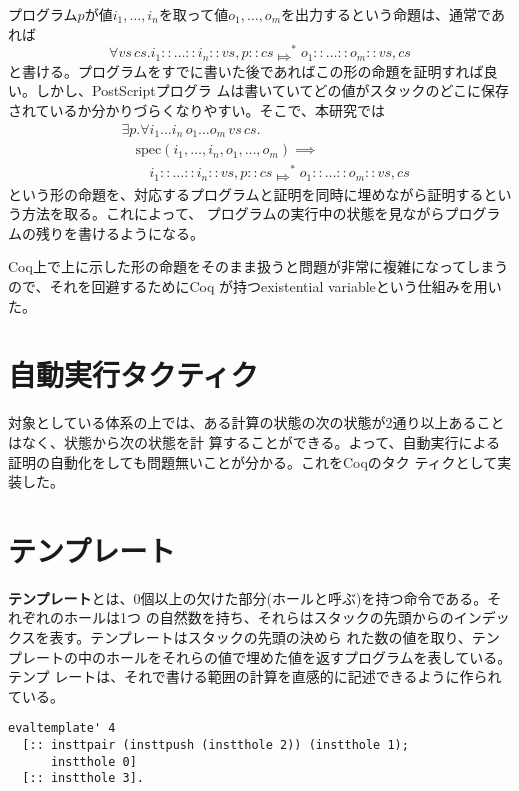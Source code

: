\documentclass[a4paper, 10.5pt, twocolumn]{ujarticle}
\begin{document}
プログラム$p$が値$i_1, \dots, i_n$を取って値$o_1, \dots, o_m$を出力するという命題は、通常であれば
\[
 \forall \mathit{vs} \, \mathit{cs}.
 i_1 :: \ldots :: i_n :: vs, p :: cs \Mapsto^* o_1 :: \ldots :: o_m :: vs, cs
\]
と書ける。プログラムをすでに書いた後であればこの形の命題を証明すれば良い。しかし、PostScriptプログラ
ムは書いていてどの値がスタックのどこに保存されているか分かりづらくなりやすい。そこで、本研究では
\begin{align*}
 & \exists p. \forall i_1 \dots i_n \, o_1 \dots o_m \, \mathit{vs} \, \mathit{cs}. \\
 & \quad \mathrm{spec}(i_1, \dots, i_n, o_1, \dots, o_m) \implies \\
 & \quad\quad i_1 :: \ldots :: i_n :: vs, p :: cs \Mapsto^* o_1 :: \ldots :: o_m :: vs, cs
\end{align*}
という形の命題を、対応するプログラムと証明を同時に埋めながら証明するという方法を取る。これによって、
プログラムの実行中の状態を見ながらプログラムの残りを書けるようになる。

Coq上で上に示した形の命題をそのまま扱うと問題が非常に複雑になってしまうので、それを回避するためにCoq
が持つexistential variableという仕組みを用いた。

\section*{自動実行タクティク}

対象としている体系の上では、ある計算の状態の次の状態が2通り以上あることはなく、状態から次の状態を計
算することができる。よって、自動実行による証明の自動化をしても問題無いことが分かる。これをCoqのタク
ティクとして実装した。

\section*{テンプレート}

\textbf{テンプレート}とは、0個以上の欠けた部分(ホールと呼ぶ)を持つ命令である。それぞれのホールは1つ
の自然数を持ち、それらはスタックの先頭からのインデックスを表す。テンプレートはスタックの先頭の決めら
れた数の値を取り、テンプレートの中のホールをそれらの値で埋めた値を返すプログラムを表している。テンプ
レートは、それで書ける範囲の計算を直感的に記述できるように作られている。

\begin{lstlisting}[style=plain, label=listing:template_example, caption=テンプレートの記述の例]
evaltemplate' 4
  [:: insttpair (insttpush (instthole 2)) (instthole 1);
      instthole 0]
  [:: instthole 3].
\end{lstlisting}
\end{document}
